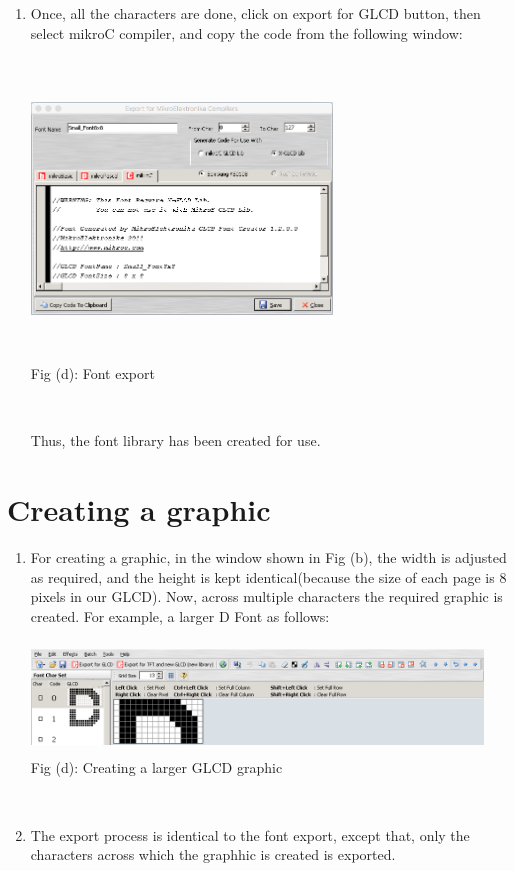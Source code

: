 \documentclass{article}
\begin{document}
\begin{enumerate}
\begin{center}
\caption{Fig (c): Font Definition} \\
\end{center}
    \item Once, all the characters are done, click on export for GLCD button, then select mikroC compiler, and copy the code from the following window:
\begin{center}
\includegraphics[width=8cm, height=8cm]{Screens/FontExporting} \\
\caption{Fig (d): Font export} \\
\end{center}
\qquad Thus, the font library has been created for use.
\end{enumerate}

\section{Creating a graphic}
\begin{enumerate}
    \item  For creating a graphic, in the window shown in Fig (b), the width is adjusted as required, and the height is kept identical(because the size of each page is 8 pixels in our GLCD). Now, across multiple characters the required graphic is created. For example, a larger D Font as follows:
\begin{center}
\includegraphics[width=12cm, height=3cm]{Screens/GraphicMaking} \\
\caption{Fig (d): Creating a larger GLCD graphic} \\
\end{center}
    \item The export process is identical to the font export, except that, only the characters across which the graphhic is created is exported.
\end{enumerate}
\end{document}
